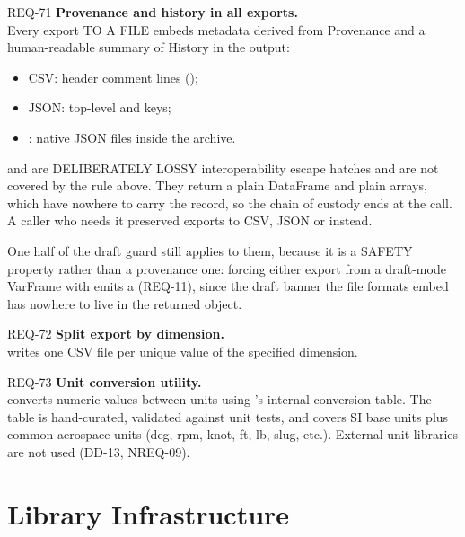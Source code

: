 \begin{reqbox}{REQ-71}{\stable}
\textbf{Provenance and history in all exports.}\\
Every export TO A FILE embeds metadata derived from Provenance and a
human-readable summary of History in the output:
\begin{itemize}[noitemsep,topsep=2pt]
  \item CSV: header comment lines ();
  \item JSON: top-level  and  keys;
  \item {}: native JSON files inside the archive.
\end{itemize}

 and  are DELIBERATELY LOSSY
interoperability escape hatches and are not covered by the rule above.
They return a plain DataFrame and plain arrays, which have nowhere to
carry the record, so the chain of custody ends at the call. A caller who
needs it preserved exports to CSV, JSON or \itc{} instead.

One half of the draft guard still applies to them, because it is a
SAFETY property rather than a provenance one: forcing either export from
a draft-mode VarFrame with  emits a
 (REQ-11), since the draft banner the file
formats embed has nowhere to live in the returned object.
\end{reqbox}

\begin{reqbox}{REQ-72}{\stable}
\textbf{Split export by dimension.}\\
 writes one CSV file per unique
value of the specified dimension.
\end{reqbox}

\begin{reqbox}{REQ-73}{\stable}
\textbf{Unit conversion utility.}\\
 converts numeric
values between units using \itc{}'s internal conversion table. The table
is hand-curated, validated against unit tests, and covers SI base units
plus common aerospace units (deg, rpm, knot, ft, lb, slug, etc.).
External unit libraries are not used (DD-13, NREQ-09).
\end{reqbox}

\section{Library Infrastructure}
\label{sec:library-infrastructure}

